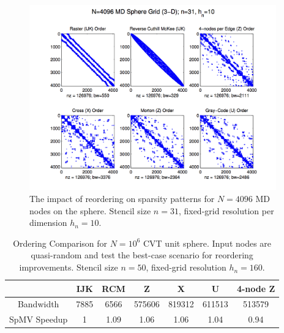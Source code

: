 \documentclass{report}
\begin{document}
\begin{figure}[ht]
\centering
\includegraphics[width=0.95\textwidth]{rbffd_methods_content/hashing/dm_node_orderings_md4096_n31_hn10.png} 
\caption{ The impact of reordering on sparsity patterns for $N=4096$ MD nodes on the sphere. Stencil size $n=31$, fixed-grid resolution per dimension $h_n=10$. }
\label{fig:ordering_impact_cvt}
\end{figure}

\begin{table}[h]\footnotesize
  \centering
  \caption{Ordering Comparison for $N=10^6$ CVT unit sphere. Input nodes are quasi-random and test the best-case scenario for reordering improvements. Stencil size $n=50$, fixed-grid resolution $h_n=160$.}
  \label{tbl:ordering_impact}
  \begin{tabular}{ c | c | c | c | c | c | c }
               & IJK & RCM & Z & X & U & 4-node Z \\
               \hline
   Bandwidth   &  7885	& 6566	& 575606 &	819312 & 611513 & 513579   \\
   \hline
   SpMV Speedup & 1 &	1.09 & 1.06 & 1.06 & 1.04 & 0.94 \\
  \end{tabular}
\end{table}


\end{document}
